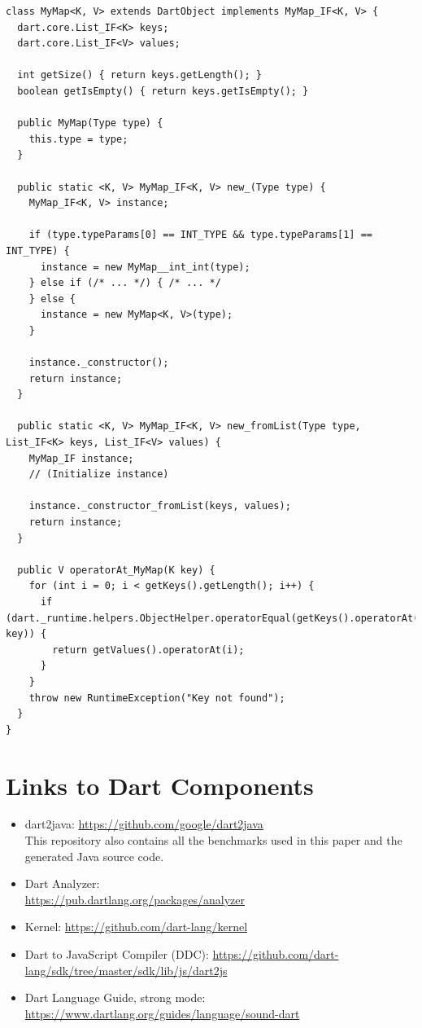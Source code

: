\documentclass[sigplan,9pt]{acmart}
\begin{document}
\begin{lstlisting}
class MyMap<K, V> extends DartObject implements MyMap_IF<K, V> {
  dart.core.List_IF<K> keys;
  dart.core.List_IF<V> values;

  int getSize() { return keys.getLength(); }
  boolean getIsEmpty() { return keys.getIsEmpty(); }
  
  public MyMap(Type type) {
    this.type = type;
  }
  
  public static <K, V> MyMap_IF<K, V> new_(Type type) {
  	MyMap_IF<K, V> instance;
   
    if (type.typeParams[0] == INT_TYPE && type.typeParams[1] == INT_TYPE) {
      instance = new MyMap__int_int(type);
    } else if (/* ... */) { /* ... */
    } else {
      instance = new MyMap<K, V>(type);
    }
    
    instance._constructor();
    return instance;
  }
  
  public static <K, V> MyMap_IF<K, V> new_fromList(Type type, List_IF<K> keys, List_IF<V> values) {
  	MyMap_IF instance;
    // (Initialize instance)
    
    instance._constructor_fromList(keys, values);
    return instance;
  }
  
  public V operatorAt_MyMap(K key) {
    for (int i = 0; i < getKeys().getLength(); i++) {
      if (dart._runtime.helpers.ObjectHelper.operatorEqual(getKeys().operatorAt(i), key)) {
        return getValues().operatorAt(i);
      }
    }
    throw new RuntimeException("Key not found");
  }
}
\end{lstlisting}

\section{Links to Dart Components}
\begin{itemize}
	\item dart2java: \url{https://github.com/google/dart2java} \\
    This repository also contains all the benchmarks used in this paper and the generated Java source code.
	\item Dart Analyzer:\\ \url{https://pub.dartlang.org/packages/analyzer}
    \item Kernel: \url{https://github.com/dart-lang/kernel}
    \item Dart to JavaScript Compiler (DDC): \url{https://github.com/dart-lang/sdk/tree/master/sdk/lib/js/dart2js}
    \item Dart Language Guide, strong mode: \\ \url{https://www.dartlang.org/guides/language/sound-dart}
\end{itemize}
\end{document}
